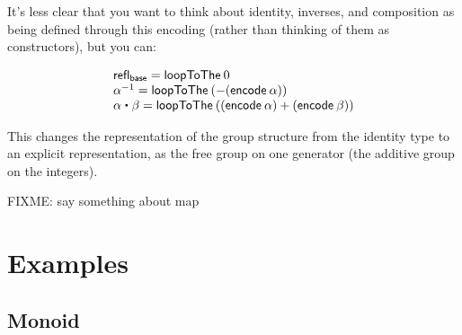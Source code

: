 It's less clear that you want to think about identity, inverses, and
composition as being defined through this encoding (rather than thinking
of them as constructors), but you can:

\[
\begin{array}{l}
\refl{\mathsf{base}} = \mathsf{loopToThe} \: 0 \\
\opp{\alpha} = \mathsf{loopToThe} \: (- (\mathsf{encode} \: \alpha)) \\
\alpha \ct \beta = \mathsf{loopToThe} \: ((\mathsf{encode} \: \alpha) + (\mathsf{encode} \: \beta)) \\
\end{array}
\]

This changes the representation of the group structure
from the identity type to an explicit representation, as the free group
on one generator (the additive group on the integers).  

FIXME: say something about map

\section{Examples}

\subsection{Monoid}


